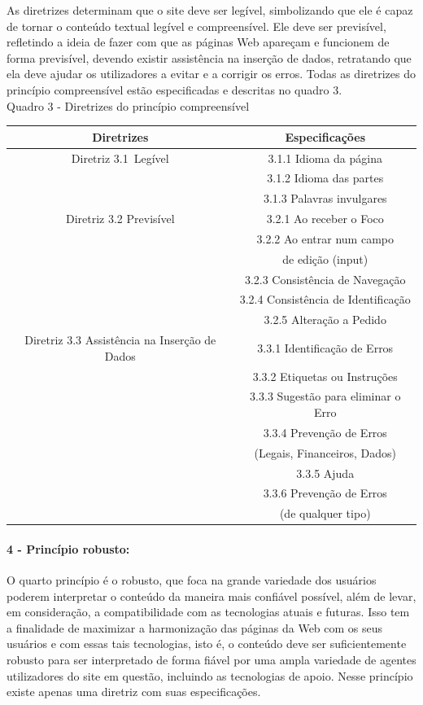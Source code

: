 \documentclass[a4paper]{article}
\begin{document}
\begin{titlepage}
As diretrizes determinam que o site deve ser legível, simbolizando que ele é capaz de tornar o conteúdo textual legível e compreensível. Ele deve ser previsível, refletindo a ideia de fazer com que as páginas Web apareçam e funcionem de forma previsível, devendo existir assistência na inserção de dados, retratando que ela deve ajudar os utilizadores a evitar e a corrigir os erros. Todas as diretrizes do princípio compreensível estão especificadas e descritas no quadro 3.\\

Quadro 3 - Diretrizes do princípio compreensível\\[-1cm]
\begin{center}
	\begin{longtable}{|c|c|}
		\hline
		Diretrizes & Especificações \\
		\hline
		Diretriz 3.1 Legível& 3.1.1 Idioma da página\\
		& 3.1.2 Idioma das partes\\
		& 3.1.3 Palavras invulgares\\
		\hline
		Diretriz 3.2 Previsível & 3.2.1 Ao receber o Foco\\
		& 3.2.2 Ao entrar num campo\\
		& de edição (input)\\
		& 3.2.3 Consistência de Navegação\\
		& 3.2.4 Consistência de Identificação\\
		& 3.2.5 Alteração a Pedido\\
		\hline
		Diretriz 3.3 Assistência na Inserção de Dados& 3.3.1 Identificação de Erros\\
		& 3.3.2 Etiquetas ou Instruções\\
		& 3.3.3 Sugestão para eliminar o Erro\\
		& 3.3.4 Prevenção de Erros\\
		& (Legais, Financeiros, Dados)\\
		& 3.3.5 Ajuda\\
		& 3.3.6 Prevenção de Erros\\
		& (de qualquer tipo)\\
		\hline
	\end{longtable}
\end{center}

\paragraph{4 - Princípio robusto: }

O quarto princípio é o robusto, que foca na grande variedade dos usuários poderem interpretar o conteúdo da maneira mais confiável possível, além de levar, em consideração, a compatibilidade com as tecnologias atuais e futuras. Isso tem a finalidade de maximizar a harmonização das páginas da Web com os seus usuários e com essas tais tecnologias, isto é, o conteúdo deve ser suficientemente robusto para ser interpretado de forma fiável por uma ampla variedade de agentes utilizadores do site em questão, incluindo as tecnologias de apoio. Nesse princípio existe apenas uma diretriz com suas especificações.


\end{titlepage}
\end{document}
